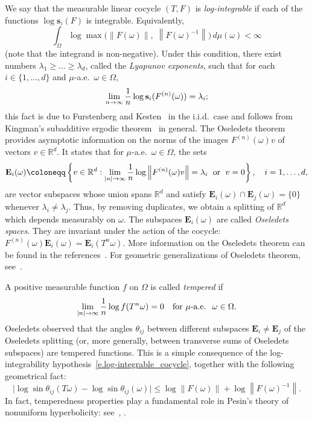 \documentclass[AHL,Unicode,longabstracts,published]{cedram}
\newcommand{\R}{\mathbb{R}}
\newcommand{\E}{\mathbf{E}}
\newcommand{\bfs}{\mathbf{s}}
\renewcommand*{\to}{\mathchoice{\longrightarrow}{\rightarrow}{\rightarrow}{\rightarrow}}
\newcommand{\R}{\mathbb{R}}
\begin{document}
We say that the measurable linear cocycle $(T,F)$ is \emph{log-integrable} if each of the functions $\log \bfs_i(F)$ is integrable. Equivalently,
\begin{equation}\label{e.log-integrable_cocycle}
\int_\Omega \log \max \bigl(\|F(\omega)\|,\; \left\|F(\omega)^{-1}\right\| \bigr) \, d\mu(\omega) < \infty
\end{equation}
(note that the integrand is non-negative). Under this condition, there exist numbers $\lambda_1 \ge \dots \ge \lambda_d$, called the \emph{Lyapunov exponents}, such that for each $i \in \{1,\dots, d\}$ and $\mu$-a.e.~$\omega \in \Omega$,
\begin{equation}
\lim_{n \to \infty} \frac{1}{n} \log \bfs_i(F^{(n)}(\omega)) = \lambda_i ;
\end{equation}
this fact is due to Furstenberg and Kesten~\cite{FK} in the i.i.d.\ case and follows from Kingman's subadditive ergodic theorem~\cite{kingman} in general. The Oseledets theorem~\cite{oseledets} provides asymptotic information on the norms of the images $F^{(n)}(\omega) v$ of vectors $v \in \R^d$. It states that for $\mu$-a.e.\ $\omega \in \Omega$, the sets
\begin{equation}
\E_i(\omega) \coloneqq \left\{ v \in\R^d : \lim_{|n| \to \infty} \frac{1}{n} \log \left\| F^{(n)}(\omega) v\right\| = \lambda_i \;\text{ or }\; v=0\right\}, \quad i=1, \dots,d,
\end{equation}
are vector subspaces whose union spans $\R^d$ and satisfy $\E_i(\omega) \cap \E_j(\omega) = \{0\}$ whenever $\lambda_i \neq \lambda_j$. Thus, by removing duplicates, we obtain a splitting of $\R^d$ which depends measurably on $\omega$. The subspaces $\E_i(\omega)$ are called \emph{Oseledets spaces}. They are invariant under the action of the cocycle: $F^{(n)}(\omega) \E_i(\omega) = \E_i(T^n \omega)$. More information on the Oseledets theorem can be found in the references~\cite{arnold,barreira,ledrappier,Viana}. For geometric generalizations of Oseledets theorem, see~\cite{filip}.

A positive measurable function $f$ on $\Omega$ is called \emph{tempered} if
\begin{equation}
\lim_{|n| \to \infty} \frac{1}{n} \log f(T^n \omega) = 0 \quad \text{for $\mu$-a.e. }\;\omega \in \Omega.
\end{equation}
Oseledets observed that the angles $\theta_{ij}$ between different subspaces $\E_i\neq \E_j$ of the Oseledets splitting (or, more generally, between transverse sums of Oseledets subspaces) are tempered functions. This is a simple consequence of the log-integrability hypothesis~\eqref{e.log-integrable_cocycle}, together with the following geometrical fact:
\begin{equation}\label{e.paralleloram}
\bigl| \log \sin \theta_{ij}(T \omega) - \log \sin \theta_{ij}(\omega) \bigr|
\le \log \|F(\omega)\| + \log \left\|F(\omega)^{-1}\right\|.
\end{equation}
In fact, temperedness properties play a fundamental role in Pesin's theory of nonuniform hyperbolicity: see~\cite{barreira}, \cite[Supplement]{KH}.
\end{document}
